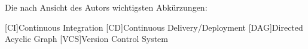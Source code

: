\chapter*{\nameoflistofacronyms}
Die nach Ansicht des Autors wichtigsten Abkürzungen:
\bigskip

\begin{adjustwidth}{1.5em}{}
\begin{acronym}[AAAAA] %
	
	
	[CI]{Continuous Integration}
	[CD]{Continuous Delivery/Deployment}
	[DAG]{Directed Acyclic Graph}
	[VCS]{Version Control System}
	
	
	
	
\end{acronym}	
\end{adjustwidth}
